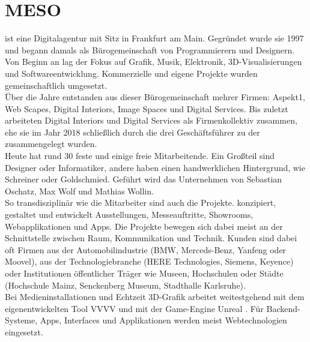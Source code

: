 \section{MESO}
\label{sec:meso}

\mesoFull{} ist eine Digitalagentur mit Sitz in Frankfurt am Main.
Gegründet wurde sie 1997 und begann damals als Bürogemeinschaft von Programmierern
und Designern. Von Beginn an lag der Fokus auf Grafik, Musik, Elektronik, 3D-Visualisierungen
und Softwareentwicklung. Kommerzielle und eigene Projekte wurden gemeinschaftlich
umgesetzt.\\

Über die Jahre entstanden aus dieser Bürogemeinschaft mehrer Firmen: Aspekt1, \meso{} Web Scapes, \meso{}
Digital Interiors, \meso{} Image Spaces und \meso{} Digital Services. Bis zuletzt arbeiteten 
\meso{} Digital Interiors und \meso{} Digital Services als Firmenkollektiv zusammen, 
ehe sie im Jahr 2018 schließlich durch die drei Geschäftsführer zu der \mesoFull{} zusammengelegt
wurden.\\
Heute hat \meso{} rund 30 feste und einige freie Mitarbeitende. Ein Großteil sind Designer oder Informatiker, 
andere haben einen handwerklichen Hintergrund, wie Schreiner oder Goldschmied. 
Geführt wird das Unternehmen von Sebastian Oschatz, Max Wolf und Mathias Wollin.\\
So transdisziplinär wie die Mitarbeiter sind auch die Projekte. \meso{} konzipiert, gestaltet und entwickelt
Ausstellungen, Messeauftritte, Showrooms, Webapplikationen und Apps. Die Projekte bewegen sich dabei meist an der
Schnittstelle zwischen Raum, Kommunikation und Technik. Kunden sind dabei oft Firmen aus der
Automobilindustrie (BMW, Merceds-Benz, Yanfeng oder Moovel), aus der Technologiebranche (HERE Technologies,
Siemens, Keyence) oder Institutionen öffentlicher Träger wie Museen, Hochschulen oder Städte (Hochschule Mainz,
Senckenberg Museum, Stadthalle Karlsruhe).\\

Bei Medieninstallationen und Echtzeit 3D-Grafik arbeitet \meso{} weitestgehend mit dem eigenentwickelten 
Tool VVVV \cite{vvvv} und mit der Game-Engine Unreal \cite{unreal}. Für Backend-Systeme, Apps, Interfaces
und Applikationen werden meist Webtechnologien eingesetzt.
